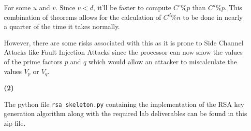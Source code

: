 \documentclass[11pt]{article}
\renewcommand\part[1]{\vspace{.10in}\textbf{(#1)}\par}
\begin{document}
		For some $u$ and $v$. Since $v < d$, it'll be faster to compute $C^v \% p$ than $C^d\%p$. This combination of theorems allows for the calculation of $C^d \% n$ to be done in nearly a quarter of the time it takes normally.

		However, there are some risks associated with this as it is prone to Side Channel Attacks like Fault Injection Attacks since the processor can now show the values of the prime factors $p$ and $q$ which would allow an attacker to miscalculate the values $V_p$ or $V_q$.

	\part{2}
		The python file \texttt{rsa\_skeleton.py} containing the implementation of the RSA key generation algorithm along with the required lab deliverables can be found in this zip file.
\end{document}
